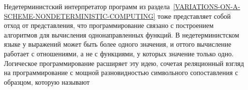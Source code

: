 Недетерминистский интерпретатор программ из 
раздела~\ref{VARIATIONS-ON-A-SCHEME-NONDETERMINISTIC-COMPUTING}
тоже представляет собой отход от представления, что
программирование связано с построением алгоритмов для вычисления
однонаправленных функций.  В недетерминистском языке у выражений может
быть более одного значения, и оттого вычисление работает с
отношениями, а не с функциями, у которых значение только
одно. Логическое программирование расширяет эту идею, сочетая
реляционный взгляд на программирование с мощной разновидностью
символьного сопоставления с образцом, которую называют  

